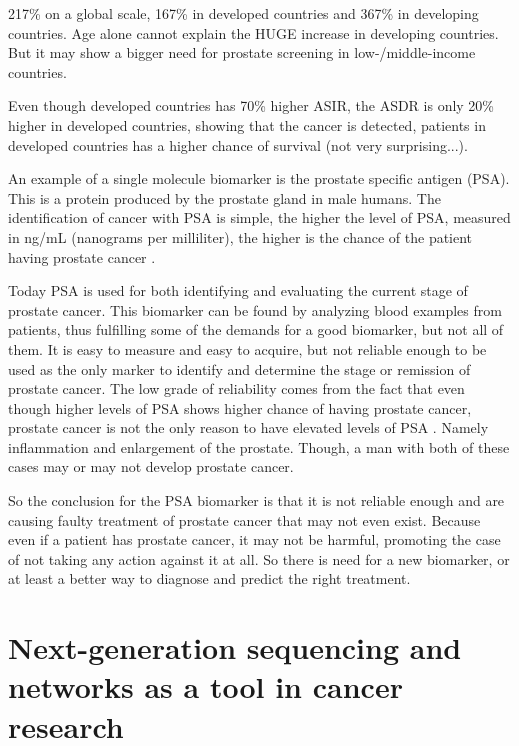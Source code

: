 217\% on a global scale, 167\% in developed countries and 367\% in developing
countries. Age alone cannot explain the HUGE increase in developing countries.
But it may show a bigger need for prostate screening in low-/middle-income
countries.

Even though developed countries has 70\% higher ASIR, the ASDR is only 20\%
higher in developed countries, showing that the cancer is detected, patients in
developed countries has a higher chance of survival (not very surprising...).

An example of a single molecule biomarker is the prostate specific antigen
(PSA). This is a protein produced by the prostate gland in male humans. The
identification of cancer with PSA is simple, the higher the level of PSA,
measured in ng/mL (nanograms per milliliter), the higher is the chance of the
patient having prostate cancer \cite{cancerfacts}.

Today PSA is used for both identifying and evaluating the current stage of
prostate cancer. This biomarker can be found by analyzing blood examples from
patients, thus fulfilling some of the demands for a good biomarker, but not all
of them. It is easy to measure and easy to acquire, but not reliable enough to
be used as the only marker to identify and determine the stage or remission of
prostate cancer. The low grade of reliability comes from the fact that even
though higher levels of PSA shows higher chance of having prostate cancer,
prostate cancer is not the only reason to have elevated levels of PSA
\cite{cancerfacts}. Namely inflammation and enlargement of the prostate. Though,
a man with both of these cases may or may not develop prostate cancer.

So the conclusion for the PSA biomarker is that it is not reliable enough and
are causing faulty treatment of prostate cancer that may not even exist. Because
even if a patient has prostate cancer, it may not be harmful, promoting the case
of not taking any action against it at all. So there is need for a new
biomarker, or at least a better way to diagnose and predict the right treatment.

\chapter{Next-generation sequencing and networks as a tool in cancer research}
